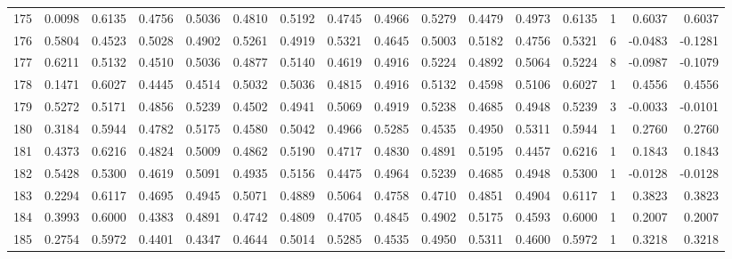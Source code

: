 \begin{tabular}{lrrrrrrrrrrrrrrr}
175 &      0.0098 &  0.6135 &  0.4756 &  0.5036 &  0.4810 &  0.5192 &  0.4745 &  0.4966 &  0.5279 &  0.4479 &   0.4973 &     0.6135 &      1 &                    0.6037 &                     0.6037 \\
176 &      0.5804 &  0.4523 &  0.5028 &  0.4902 &  0.5261 &  0.4919 &  0.5321 &  0.4645 &  0.5003 &  0.5182 &   0.4756 &     0.5321 &      6 &                   -0.0483 &                    -0.1281 \\
177 &      0.6211 &  0.5132 &  0.4510 &  0.5036 &  0.4877 &  0.5140 &  0.4619 &  0.4916 &  0.5224 &  0.4892 &   0.5064 &     0.5224 &      8 &                   -0.0987 &                    -0.1079 \\
178 &      0.1471 &  0.6027 &  0.4445 &  0.4514 &  0.5032 &  0.5036 &  0.4815 &  0.4916 &  0.5132 &  0.4598 &   0.5106 &     0.6027 &      1 &                    0.4556 &                     0.4556 \\
179 &      0.5272 &  0.5171 &  0.4856 &  0.5239 &  0.4502 &  0.4941 &  0.5069 &  0.4919 &  0.5238 &  0.4685 &   0.4948 &     0.5239 &      3 &                   -0.0033 &                    -0.0101 \\
180 &      0.3184 &  0.5944 &  0.4782 &  0.5175 &  0.4580 &  0.5042 &  0.4966 &  0.5285 &  0.4535 &  0.4950 &   0.5311 &     0.5944 &      1 &                    0.2760 &                     0.2760 \\
181 &      0.4373 &  0.6216 &  0.4824 &  0.5009 &  0.4862 &  0.5190 &  0.4717 &  0.4830 &  0.4891 &  0.5195 &   0.4457 &     0.6216 &      1 &                    0.1843 &                     0.1843 \\
182 &      0.5428 &  0.5300 &  0.4619 &  0.5091 &  0.4935 &  0.5156 &  0.4475 &  0.4964 &  0.5239 &  0.4685 &   0.4948 &     0.5300 &      1 &                   -0.0128 &                    -0.0128 \\
183 &      0.2294 &  0.6117 &  0.4695 &  0.4945 &  0.5071 &  0.4889 &  0.5064 &  0.4758 &  0.4710 &  0.4851 &   0.4904 &     0.6117 &      1 &                    0.3823 &                     0.3823 \\
184 &      0.3993 &  0.6000 &  0.4383 &  0.4891 &  0.4742 &  0.4809 &  0.4705 &  0.4845 &  0.4902 &  0.5175 &   0.4593 &     0.6000 &      1 &                    0.2007 &                     0.2007 \\
185 &      0.2754 &  0.5972 &  0.4401 &  0.4347 &  0.4644 &  0.5014 &  0.5285 &  0.4535 &  0.4950 &  0.5311 &   0.4600 &     0.5972 &      1 &                    0.3218 &                     0.3218 \\

\end{tabular}

